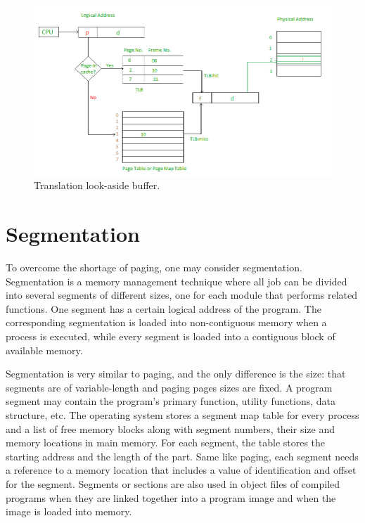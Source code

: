 \documentclass[doc,natbib,12pt]{apa6}
\begin{document}
	\begin{figure}[h]
		\centering
		\includegraphics[width=1\textwidth]{TLB.jpg}
		\caption{\label{fig:TLB}Translation look-aside buffer. \citep{GeeksforGeeks2018}}
	\end{figure}
	
	
	\newpage
	\section{Segmentation} \label{chp:segmentation}
	To overcome the shortage of paging, one may consider segmentation. Segmentation is a memory management technique where all job can be divided into several segments of different sizes, one for each module that performs related functions. One segment has a certain logical address of the program. The corresponding segmentation is loaded into non-contiguous memory when a process is executed, while every segment is loaded into a contiguous block of available memory.
	
	Segmentation is very similar to paging, and the only difference is the size: that segments are of variable-length and paging pages sizes are fixed. A program segment may contain the program's primary function, utility functions, data structure, etc. The operating system stores a segment map table for every process and a list of free memory blocks along with segment numbers, their size and memory locations in main memory. For each segment, the table stores the starting address and the length of the part. Same like paging, each segment needs a reference to a memory location that includes a value of identification and offset for the segment. Segments or sections are also used in object files of compiled programs when they are linked together into a program image and when the image is loaded into memory.
	
\end{document}
